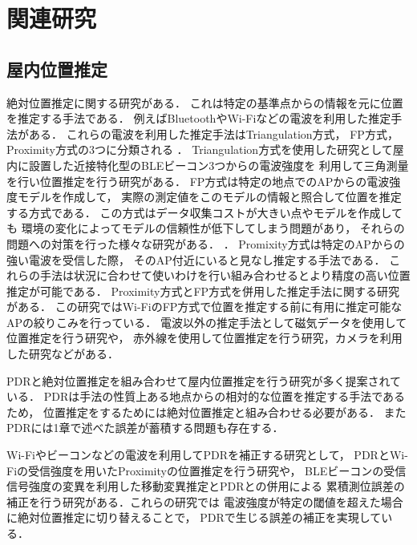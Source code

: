 


\chapter{関連研究}


\section{屋内位置推定}

絶対位置推定に関する研究がある．
これは特定の基準点からの情報を元に位置を推定する手法である．
例えばBluetoothやWi-Fiなどの電波を利用した推定手法がある．
これらの電波を利用した推定手法はTriangulation方式，
FP方式，Proximity方式の3つに分類される
\cite{wireless-lan-summary}．
Triangulation方式を使用した研究として屋内に設置した近接特化型のBLEビーコン3つからの電波強度を
利用して三角測量を行い位置推定を行う研究がある\cite{ble-indoor}\cite{ble-tandem}\cite{triangulation-kalman}．
FP方式は特定の地点でのAPからの電波強度モデルを作成して，
実際の測定値をこのモデルの情報と照合して位置を推定する方式である．
この方式はデータ収集コストが大きい点やモデルを作成しても
環境の変化によってモデルの信頼性が低下してしまう問題があり，
それらの問題への対策を行った様々な研究がある．
\cite{gaussian-mixture-model}
\cite{wireless-lan-cost-reduction}
\cite{fingerprint-auto-update}
\cite{wi-fi-fingerprint-domain}．
Promixity方式は特定のAPからの強い電波を受信した際，
そのAP付近にいると見なし推定する手法である．
これらの手法は状況に合わせて使いわけを行い組み合わせるとより精度の高い位置推定が可能である．
Proximity方式とFP方式を併用した推定手法に関する研究がある\cite{proximity-fingerprint}．
この研究ではWi-FiのFP方式で位置を推定する前に有用に推定可能なAPの絞りこみを行っている．
電波以外の推定手法として磁気データを使用して位置推定を行う研究\cite{pdr-mag}や，
赤外線を使用して位置推定を行う研究\cite{infrared}，カメラを利用した研究\cite{camera}などがある．


PDRと絶対位置推定を組み合わせて屋内位置推定を行う研究が多く提案されている．
PDRは手法の性質上ある地点からの相対的な位置を推定する手法であるため，
位置推定をするためには絶対位置推定と組み合わせる必要がある．
またPDRには1章で述べた誤差が蓄積する問題も存在する．

Wi-Fiやビーコンなどの電波を利用してPDRを補正する研究として，
PDRとWi-Fiの受信強度を用いたProximityの位置推定を行う研究\cite{pdr-wifi}や，
BLEビーコンの受信信号強度の変異を利用した移動変異推定とPDRとの併用による
累積測位誤差の補正を行う研究\cite{pdr-ble}がある．これらの研究では
電波強度が特定の閾値を超えた場合に絶対位置推定に切り替えることで，
PDRで生じる誤差の補正を実現している．

